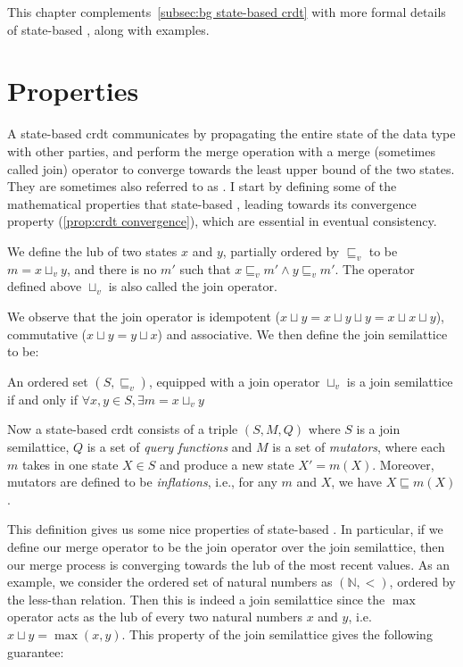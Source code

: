 This chapter complements~\cref{subsec:bg state-based crdt} with more formal details
of state-based , along
with examples. 

\section{Properties}

A state-based \acrshort{crdt} communicates by propagating the entire state of 
the data type with other parties, and perform the merge operation with a merge
(sometimes called join) operator to converge towards the least upper bound of the 
two states. They are sometimes also referred to as . I start by
defining some of the mathematical properties that state-based ,
leading towards its convergence property (\cref{prop:crdt convergence}), which
are essential in eventual consistency.

\begin{definition}

We define the \acrshort{lub} of two states \(x\) and \(y\), partially
ordered by \(\sqsubseteq_v\) to be \(m=x \sqcup_v y\), and there is no \(m'\) such that
\(x\sqsubseteq_v m' \land y\sqsubseteq_v m'\). The operator defined above \(\sqcup_v\)
is also called the join operator.

\end{definition}

We observe that the join operator is idempotent 
(\(x\sqcup y = x\sqcup y \sqcup y = x\sqcup x \sqcup y\)),
commutative (\(x\sqcup y = y\sqcup x\)) and associative.
We then define the join semilattice to be:

\begin{definition}
  An ordered set \((S, \sqsubseteq_v)\), equipped with a join operator \(\sqcup_v\) 
  is a join semilattice if and only if \(\forall x, y\in S, \exists m = x\sqcup_v y\)
\end{definition}

Now a state-based \acrshort{crdt} consists of a triple \((S, M, Q)\) where \(S\)
is a join semilattice, \(Q\) is a set of \emph{query functions} and \(M\) is a set of
\emph{mutators}, where each \(m\) takes in one state \(X\in S\) and produce a new state
\(X'=m(X)\). Moreover, mutators are defined to be \emph{inflations}, i.e., for
any \(m\) and \(X\), we have \(X\sqsubseteq m(X)\).

This definition gives us some nice properties of state-based .
In particular, if we define our merge operator to be the join operator over
the join semilattice, then our merge process is converging towards the \acrshort{lub} 
of the most recent values. 
As an example, we consider the ordered set of natural numbers as \((\mathbb N, <)\),
ordered by the less-than relation. Then this is indeed a join semilattice
since the \(\max\) operator acts as the \acrshort{lub} of every two natural numbers
\(x\) and \(y\), i.e.\ \(x\sqcup y = \max(x,y)\). This property of the join 
semilattice gives the following guarantee:

